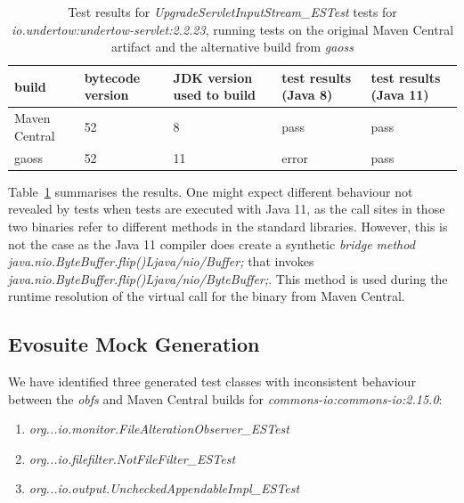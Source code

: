 \documentclass[conference]{IEEEtran}
\begin{document}
\begin{table}[h]
	\begin{tabular}{|p{1.8cm}p{0.9cm}p{1.5cm}p{1.2cm}p{1.2cm}|}
		\hline
		build         & bytecode version & JDK version used to build & test results (Java 8)                                                    & test results (Java 11) \\ \hline 
		Maven Central & 52               & 8                         & pass                                                                     & pass                   \\
		gaoss         & 52               & 11                        & error & pass                  \\ \hline
	\end{tabular}
	\caption{Test results for \textit{UpgradeServletInputStream\_ESTest} tests for  \textit{io.undertow:undertow-servlet:2.2.23}, running tests on the original Maven Central artifact and the alternative build from \textit{gaoss}}
	\label{tab:nosuchmethoderror}
\end{table}

Table~\ref{tab:nosuchmethoderror} summarises the results. One might expect different behaviour not revealed by tests when tests are executed with Java 11, as the call sites in those two binaries refer to different methods in the standard libraries. However, this is not the case as the Java 11 compiler does create a synthetic \textit{bridge method} \textit{java.nio.ByteBuffer.flip()Ljava/nio/Buffer;}  that invokes \textit{java.nio.ByteBuffer.flip()Ljava/nio/ByteBuffer;}. This method is used during the  runtime resolution of the virtual call for the binary from Maven Central.  


\subsection{Evosuite Mock Generation}


We have identified three generated test classes with inconsistent behaviour between the \textit{obfs} and Maven Central builds for \textit{commons-io:commons-io:2.15.0}: 
\begin{enumerate}
	\item  \textit{org...io.monitor.FileAlterationObserver\_ESTest}
    \item \textit{ org...io.filefilter.NotFileFilter\_ESTest}
    \item  \textit{org...io.output.UncheckedAppendableImpl\_ESTest}
\end{enumerate}
\end{document}
